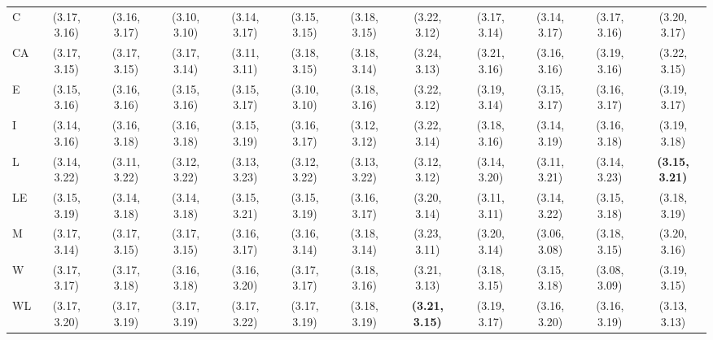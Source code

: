 \begin{flushleft}
\begin{flushleft}
\begin{table}[h!]
{\begin{tabular}{lccccccccccc}
                C  & (3.17, 3.16) & (3.16, 3.17) & (3.10, 3.10) & (3.14, 3.17) & (3.15, 3.15) & (3.18, 3.15) & (3.22, 3.12) & (3.17, 3.14) & (3.14, 3.17) & (3.17, 3.16) & (3.20, 3.17) \\
                
                CA & (3.17, 3.15) & (3.17, 3.15) & (3.17, 3.14) & (3.11, 3.11) & (3.18, 3.15) & (3.18, 3.14) & (3.24, 3.13) & \cellcolor{gray!16}(3.21, 3.16) & \cellcolor{gray!16}(3.16, 3.16) & (3.19, 3.16) & \cellcolor{gray!16}(3.22, 3.15) \\
                
                E  & (3.15, 3.16) & (3.16, 3.16) & (3.15, 3.16) & \cellcolor{gray!16}(3.15, 3.17) & (3.10, 3.10) & (3.18, 3.16) & (3.22, 3.12) & (3.19, 3.14) & (3.15, 3.17) & (3.16, 3.17) & (3.19, 3.17) \\
                
                I  & (3.14, 3.16) & (3.16, 3.18) & (3.16, 3.18) & (3.15, 3.19) & (3.16, 3.17) & (3.12, 3.12) & (3.22, 3.14) & (3.18, 3.16) & (3.14, 3.19) & (3.16, 3.18) & (3.19, 3.18) \\

                L  & (3.14, 3.22) & (3.11, 3.22) & (3.12, 3.22) & (3.13, 3.23) & (3.12, 3.22) & (3.13, 3.22) & (3.12, 3.12) & (3.14, 3.20) & (3.11, 3.21) & (3.14, 3.23) & \textbf{(3.15, 3.21)} \\
                
                LE & (3.15, 3.19) & (3.14, 3.18) & (3.14, 3.18) & (3.15, 3.21) & (3.15, 3.19) & (3.16, 3.17) & (3.20, 3.14) & (3.11, 3.11) & (3.14, 3.22) & (3.15, 3.18) & (3.18, 3.19) \\
                
                M  & (3.17, 3.14) & (3.17, 3.15) & (3.17, 3.15) & \cellcolor{gray!16}(3.16, 3.17) & (3.16, 3.14) & (3.18, 3.14) & (3.23, 3.11) & (3.20, 3.14) & (3.06, 3.08) & (3.18, 3.15) & (3.20, 3.16) \\
                
                W  & (3.17, 3.17) & (3.17, 3.18) & (3.16, 3.18) & \cellcolor{gray!16}(3.16, 3.20) & (3.17, 3.17) & (3.18, 3.16) & (3.21, 3.13) & (3.18, 3.15) & (3.15, 3.18) & (3.08, 3.09) & (3.19, 3.15) \\
            
                WL & (3.17, 3.20) & (3.17, 3.19) & (3.17, 3.19) & (3.17, 3.22) & (3.17, 3.19) & (3.18, 3.19) & \textbf{(3.21, 3.15)} & (3.19, 3.17) & \cellcolor{gray!16}(3.16, 3.20) & (3.16, 3.19) & (3.13, 3.13) \\
                \hline
            \end{tabular}
            }
        \end{table}


\end{flushleft}
\end{flushleft}
